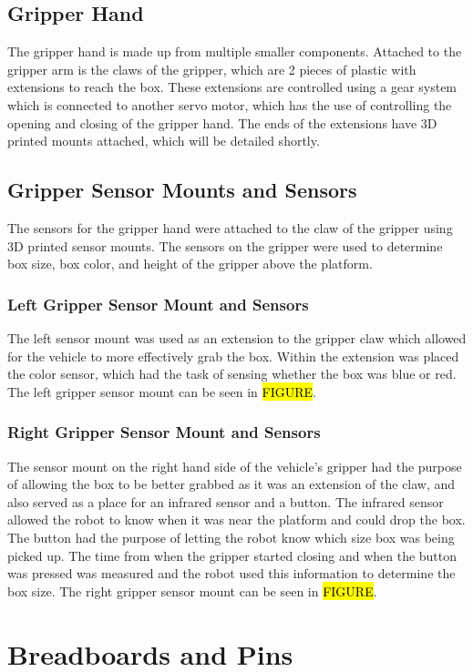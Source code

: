 \documentclass[11pt]{report}
\begin{document}
\subsection{Gripper Hand}
The gripper hand is made up from multiple smaller components. Attached to the gripper arm is the claws of the gripper, which are 2 pieces of plastic with extensions to reach the box. These extensions are controlled using a gear system which is connected to another servo motor, which has the use of controlling the opening and closing of the gripper hand. The ends of the extensions have 3D printed mounts attached, which will be detailed shortly. 
\subsection{Gripper Sensor Mounts and Sensors}
The sensors for the gripper hand were attached to the claw of the gripper using 3D printed sensor mounts. The sensors on the gripper were used to determine box size, box color, and height of the gripper above the platform. 
\subsubsection{Left Gripper Sensor Mount and Sensors}
The left sensor mount was used as an extension to the gripper claw which allowed for the vehicle to more effectively grab the box. Within the extension was placed the color sensor, which had the task of sensing whether the box was blue or red. The left gripper sensor mount can be seen in \hl{FIGURE}.
\subsubsection{Right Gripper Sensor Mount and Sensors}
The sensor mount on the right hand side of the vehicle’s gripper had the purpose of allowing the box to be better grabbed as it was an extension of the claw, and also served as a place for an infrared sensor and a button. The infrared sensor allowed the robot to know when it was near the platform and could drop the box. The button had the purpose of letting the robot know which size box was being picked up. The time from when the gripper started closing and when the button was pressed was measured and the robot used this information to determine the box size. The right gripper sensor mount can be seen in \hl{FIGURE}.

\section{Breadboards and Pins}\label{sec:breadboard-and-pins}
\end{document}
